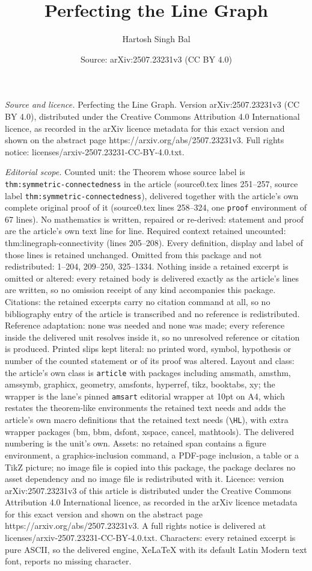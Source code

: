 \documentclass[10pt,a4paper]{amsart}
\title[Perfecting the Line Graph]{Perfecting the Line Graph}
\author{Hartosh Singh Bal}
\date{Source: arXiv:2507.23231v3 (CC BY 4.0)}
\begin{document}
\maketitle

\noindent\emph{Source and licence.} Perfecting the Line Graph. Version arXiv:2507.23231v3 (CC BY 4.0), distributed under the Creative Commons Attribution 4.0 International licence, as recorded in the arXiv licence metadata for this exact version and shown on the abstract page https://arxiv.org/abs/2507.23231v3. Full rights notice: licenses/arxiv-2507.23231-CC-BY-4.0.txt.\par\smallskip

\noindent\textit{Editorial scope.} Counted unit: the Theorem whose source label is \texttt{thm:symmetric-connectedness} in the article (source0.tex lines 251--257, source label \texttt{thm:symmetric-connectedness}), delivered together with the article's own complete original proof of it (source0.tex lines 258--324, one \texttt{proof} environment of 67 lines). No mathematics is written, repaired or re-derived: statement and proof are the article's own text line for line. Required context retained uncounted: thm:linegraph-connectivity (lines 205--208). Every definition, display and label of those lines is retained unchanged. Omitted from this package and not redistributed: 1--204, 209--250, 325--1334. Nothing inside a retained excerpt is omitted or altered: every retained body is delivered exactly as the article's lines are written, so no omission receipt of any kind accompanies this package. Citations: the retained excerpts carry no citation command at all, so no bibliography entry of the article is transcribed and no reference is redistributed. Reference adaptation: none was needed and none was made; every reference inside the delivered unit resolves inside it, so no unresolved reference or citation is produced. Printed slips kept literal: no printed word, symbol, hypothesis or number of the counted statement or of its proof was altered. Layout and class: the article's own class is \texttt{article} with packages including amsmath, amsthm, amssymb, graphicx, geometry, amsfonts, hyperref, tikz, booktabs, xy; the wrapper is the lane's pinned \texttt{amsart} editorial wrapper at 10pt on A4, which restates the theorem-like environments the retained text needs and adds the article's own macro definitions that the retained text needs (\texttt{\textbackslash HL}), with extra wrapper packages (bm, bbm, dsfont, xspace, cancel, mathtools). The delivered numbering is the unit's own. Assets: no retained span contains a figure environment, a graphics-inclusion command, a PDF-page inclusion, a table or a TikZ picture; no image file is copied into this package, the package declares no asset dependency and no image file is redistributed with it. Licence: version arXiv:2507.23231v3 of this article is distributed under the Creative Commons Attribution 4.0 International licence, as recorded in the arXiv licence metadata for this exact version and shown on the abstract page https://arxiv.org/abs/2507.23231v3. A full rights notice is delivered at licenses/arxiv-2507.23231-CC-BY-4.0.txt. Characters: every retained excerpt is pure ASCII, so the delivered engine, XeLaTeX with its default Latin Modern text font, reports no missing character.
\end{document}
